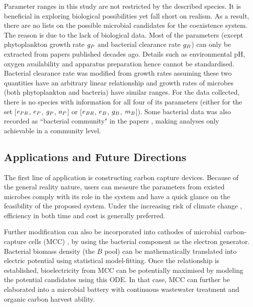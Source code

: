 \documentclass[../thesis.tex]{subfiles} %
\begin{document}
Parameter ranges in this study are not restricted by the described species.  It is beneficial in exploring biological possibilities yet fall short on realism.  As a result, there are no lists on the possible microbial candidates for the coexistence system.  The reason is due to the lack of biological data.  Most of the parameters (except phytoplankton growth rate $g_P$ and bacterial clearance rate $g_B$) can only be extracted from papers published decades ago.  Details such as environmental pH, oxygen availability and apparatus preparation hence cannot be standardised.  Bacterial clearance rate was modified from growth rates assuming these two quantities have an arbitrary linear relationship and growth rates of microbes (both phytoplankton and bacteria) have similar ranges.  For the data collected, there is no species with information for all four of its parameters (either for the set [$e_{PR}$, $e_P$, $g_P$, $a_P$] or [$e_{BR}$, $e_B$, $g_B$, $m_B$]).  Some bacterial data was also recorded as ``bacterial community" in the papers \autocite{cochran1988estimation}, making analyses only achievable in a community level.

\subsection{Applications and Future Directions}
The first line of application is constructing carbon capture devices.  Because of the general reality nature, users can measure the parameters from existed microbes comply with its role in the system and have a quick glance on the feasibility of the proposed system.  Under the increasing risk of climate change \autocite{notz2016observed,schuur2015climate}, efficiency in both time and cost is generally preferred.

Further modification can also be incorporated into cathodes of microbial carbon-capture cells (MCC) \autocite{varanasi2020improvement,mohamed2020bioelectricity,neethu2018enhancement,pandit2012microbial}, by using the bacterial component as the electron generator.  Bacterial biomass density (the $B$ pool) can be mathematically translated into electric potential using statistical model-fitting.  Once the relationship is established, bioelectricity from MCC can be potentially maximised by modeling the potential candidates using this ODE.  In that case, MCC can further be elaborated into a microbial battery with continuous wastewater treatment \autocite{mohamed2020bioelectricity} and organic carbon harvest ability.
\end{document}
